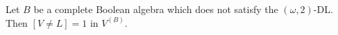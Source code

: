 Let $B$ be a complete Boolean algebra which does not satisfy the $(\omega, 2)$-DL. Then $[V \neq L] = 1$ in $V^{(B)}$.
